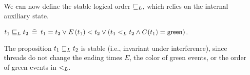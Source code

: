 We can now define the stable logical order $\mathrel{\sqsubseteq_L}$, which relies on
the internal auxiliary state.
%
\begin{definition}\label{def-jleq}
$t_1 \mathrel{\sqsubseteq_L} t_2 \mathrel{\:\widehat{=}\:} t_1 = t_2 \vee E\,(t_1) < t_2 \vee (t_1 \mathrel{<_L} t_2 \wedge C(t_1) = \mathsf{green})$.
\end{definition}
The proposition $t_1 \mathrel{\sqsubseteq_L} t_2$ is stable (i.e., invariant under
interference), since threads do not change the ending times $E$, the
color of green events, or the order of green events in $\mathrel{<_L}$.

%
%


%





